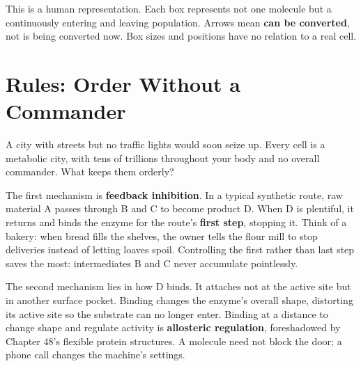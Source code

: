 \begin{center}
\end{center}

This is a human representation. Each box represents not one molecule but a continuously entering and leaving population. Arrows mean \textbf{can be converted}, not is being converted now. Box sizes and positions have no relation to a real cell.

\section{Rules: Order Without a Commander}

A city with streets but no traffic lights would soon seize up. Every cell is a metabolic city, with tens of trillions throughout your body and no overall commander. What keeps them orderly?

The first mechanism is \textbf{feedback inhibition}. In a typical synthetic route, raw material A passes through B and C to become product D. When D is plentiful, it returns and binds the enzyme for the route's \textbf{first step}, stopping it. Think of a bakery: when bread fills the shelves, the owner tells the flour mill to stop deliveries instead of letting loaves spoil. Controlling the first rather than last step saves the most: intermediates B and C never accumulate pointlessly.

The second mechanism lies in how D binds. It attaches not at the active site but in another surface pocket. Binding changes the enzyme's overall shape, distorting its active site so the substrate can no longer enter. Binding at a distance to change shape and regulate activity is \textbf{allosteric regulation}, foreshadowed by Chapter 48's flexible protein structures. A molecule need not block the door; a phone call changes the machine's settings.

